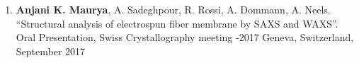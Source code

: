 	\begin{enumerate}[itemsep=0pt,parsep=7pt]

\item \textbf{Anjani K. Maurya}, A. Sadeghpour, R. Rossi, A. Dommann, A. Neels. “Structural analysis of electrospun fiber membrane by SAXS and WAXS”. Oral Presentation, Swiss Crystallography meeting -2017 Geneva, Switzerland, September 2017





		
	\end{enumerate}
